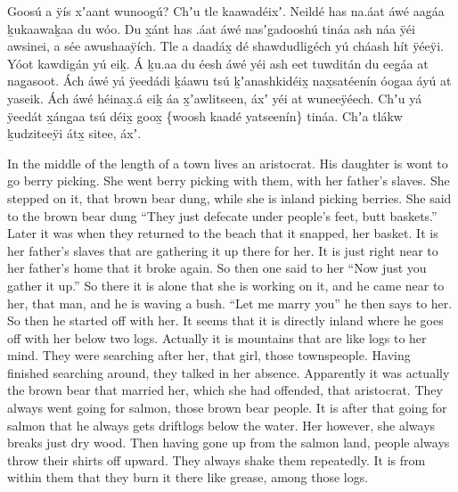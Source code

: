 \begin{pairs}
\begin{Leftside}
Goosú a ÿís xʼaant wunoogú?
Chʼu tle kaawadéixʼ.
\pend
\pstart
{}Neildé has na.áat áwé aag̱áa ḵukaawaḵaa du wóo.
Du x̱ánt has .áat áwé nasʼgadooshú tináa ash náa ÿéi awsinei, a sée awushaaÿích.
Tle a daadáx̱ dé shawdudlig̱éch yú cháash hít ÿéeÿi.
Yóot kawdigán yú eiḵ.
Á ḵu.aa du éesh áwé yéi ash eet tuwditán du eeg̱áa at nag̱asoot.
Ách áwé yá ÿeedádi ḵáawu tsú ḵʼanashkidéix̱ nax̱satéenín óog̱aa áyú at yaseik.
Ách áwé héinax̱.á eiḵ áa x̱ʼaw\-li\-tseen, áxʼ yéi at wuneeÿéech.
Chʼu yá ÿeedát x̱áng̱aa tsú déix̱ goox̱ \{woosh kaadé yatseenín\} tináa.
Chʼa tlákw ḵudziteeÿi átx̱ sitee, áxʼ.
\pend
\endnumbering
\end{Leftside}
\begin{Rightside}
\beginnumbering
\pstart
\noindent
{}In the middle of the length of a town lives an aristocrat.
His daughter is wont to go berry picking.
She went berry picking with them, with her father’s slaves.
She stepped on it, that brown bear dung, while she is inland picking berries.
She said to the brown bear dung
\qqk{}“They just de\-fecate under people’s feet, butt baskets.”
Later it was when they returned to the beach that it snapped, her basket.
It is her father’s slaves that are gathering it up there for her.
It is just right near to her father’s home that it broke again.
So then one said to her
\qqk{}“Now just you gather it up.”
So there it is alone that she is working on it,
and he came near to her, that man,
and he is waving a bush.
\qqk{}“Let me marry you” he then says to her.
So then he started off with her.
It seems that it is directly inland where he goes off with her below two logs.
Actually it is mountains that are like logs to her mind.
\pend
\pstart
{}They were searching after her, that girl, those townspeople.
Having finished searching arou\-nd, they talked in her absence.
Apparently it was actually the brown bear that married her, which she had offended, that aristocrat.
They always went going for salmon, those brown bear people.
It is after that going for salmon that he always gets driftlogs below the water.
Her however, she always breaks just dry wood.
Then having gone up from the salmon land, people always throw their shirts off upward.
They always shake them repeatedly.
It is from within them that they burn it there like grease, among those logs.

\end{Rightside}
\end{pairs}
